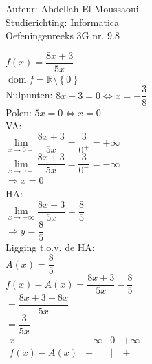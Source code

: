 \documentclass[a4paper]{article}
\begin{document}
  
\noindent \large Auteur: Abdellah El Moussaoui \\
\noindent \large Studierichting: Informatica\\
\noindent \large Oefeningenreeks 3G nr. 9.8\\

\medskip

\normalsize

$f(x) = \dfrac{8x + 3}{5x}$ \\

$\operatorname{dom}f = \mathbb{R}\setminus\left\{0\right\}$ \\

Nulpunten: $8x + 3 = 0 \Leftrightarrow x = -\dfrac{3}{8}$ \\

Polen: $5x = 0 \Leftrightarrow x = 0$ \\

VA: \\

$\lim\limits_{x\to0+}\dfrac{8x + 3}{5x} = \dfrac{3}{0^+} = +\infty$ \\

$\lim\limits_{x\to0-} \dfrac{8x+3}{5x} = \dfrac{3}{0^-} = -\infty$ \\

$\Rightarrow \boxed{x = 0}$ \\

HA: \\

$\lim\limits_{x\to\pm\infty}\dfrac{8x + 3}{5x} = \dfrac{8}{5}$ \\

$\Rightarrow\boxed{y = \dfrac{8}{5}}$ \\

Ligging t.o.v. de HA: \\

$A(x) = \dfrac{8}{5}$ \\

$f(x)-A(x) = \dfrac{8x+3}{5x} - \dfrac{8}{5}$ \\

$= \dfrac{8x+3-8x}{5x}$ \\

$= \dfrac{3}{5x}$ \\

$\begin{array}{c|ccc}
    x        & -\infty & 0 & +\infty \\ 
    \hline
    f(x)-A(x) & -       & | & + \\ 
\end{array}$ \\
\end{document}
